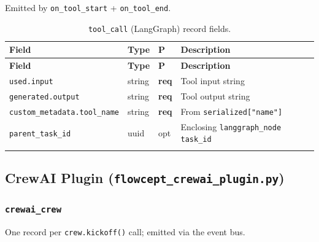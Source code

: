 \documentclass[11pt,a4paper]{article}
\newcommand{\opt}{\textcolor{optred}{opt}}
\newcommand{\req}{\textbf{req}}
\newcommand{\subtype}[1]{\texttt{\textcolor{subtypeblue}{#1}}}
\begin{document}
Emitted by \texttt{on\_tool\_start} + \texttt{on\_tool\_end}.

\begin{longtable}{L{4cm} L{2.5cm} C{1.2cm} L{6.5cm}}
\toprule
\textbf{Field} & \textbf{Type} & \textbf{P} & \textbf{Description} \\
\midrule
\endfirsthead
\toprule \textbf{Field} & \textbf{Type} & \textbf{P} & \textbf{Description} \\
\midrule
\endhead
\bottomrule
\endlastfoot

\texttt{used.input}              & string & \req & Tool input string \\
\texttt{generated.output}        & string & \req & Tool output string \\
\texttt{custom\_metadata.tool\_name} & string & \req & From \texttt{serialized["name"]} \\
\texttt{parent\_task\_id}        & uuid   & \opt & Enclosing \subtype{langgraph\_node} \texttt{task\_id} \\

\caption{\subtype{tool\_call} (LangGraph) record fields.}
\end{longtable}

\subsection{CrewAI Plugin (\texttt{flowcept\_crewai\_plugin.py})}

\subsubsection{\subtype{crewai\_crew}}

One record per \texttt{crew.kickoff()} call; emitted via the event bus.
\end{document}
